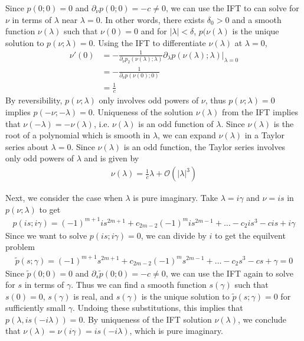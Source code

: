 \documentclass[thesis.tex]{subfiles}
\begin{document}
Since $p(0; 0) = 0$ and $\partial_\nu p(0; 0) = -c \neq 0$, we can use the IFT to can solve for $\nu$ in terms of $\lambda$ near $\lambda = 0$. In other words, there exists $\delta_0 > 0$ and a smooth function $\nu(\lambda)$ such that $\nu(0) = 0$ and for $|\lambda| < \delta$, $p(\nu(\lambda)$ is the unique solution to $p(\nu; \lambda) = 0$. Using the IFT to differentiate $\nu(\lambda)$ at $\lambda = 0$,
\begin{align*}
\nu'(0) &= -\frac{1}{\partial_\nu p_2(\nu(\lambda); \lambda) } \partial_\lambda p ( \nu(\lambda); \lambda ) \Big|_{\lambda = 0}\\
&= -\frac{1}{\partial_\nu p(\nu(0); 0) } \\
&= \frac{1}{c}
\end{align*}
By reversibility, $p(\nu; \lambda)$ only involves odd powers of $\nu$, thus $p(\nu; \lambda) = 0$ implies $p(-\nu; -\lambda) = 0$. Uniqueness of the solution $\nu(\lambda)$ from the IFT implies that $\nu(-\lambda) = -\nu(\lambda)$, i.e. $\nu(\lambda)$ is an odd function of $\lambda$. Since $\nu(\lambda)$ is the root of a polynomial which is smooth in $\lambda$, we can expand $\nu(\lambda)$ in a Taylor series about $\lambda = 0$. Since $\nu(\lambda)$ is an odd function, the Taylor series involves only odd powers of $\lambda$ and is given by
\begin{align*}
\nu(\lambda) = \frac{1}{c} \lambda + \mathcal{O}(|\lambda|^3)
\end{align*}

Next, we consider the case when $\lambda$ is pure imaginary. Take $\lambda = i \gamma$ and $\nu = i s$ in $p(\nu; \lambda)$ to get
\begin{align*}
p(i s; i \gamma) = (-1)^{m+1} i s^{2m+1} + c_{2m-2} (-1)^m i s^{2m-1} + \dots - c_2 i s^3 - c i s + i \gamma
\end{align*}
Since we want to solve $p(i s; i \gamma) = 0$, we can divide by $i$ to get the equilvent problem
\begin{align*}
\tilde{p}(s; \gamma) = (-1)^{m+1} s^{2m+1} + c_{2m-2} (-1)^m s^{2m-1} + \dots - c_2 s^3 - c s + \gamma = 0
\end{align*}
Since $\tilde{p}(0; 0) = 0$ and $\partial_s \tilde{p}(0; 0) = -c \neq 0$, we can use the IFT again to solve for $s$ in terms of $\gamma$. Thus we can find a smooth function $s(\gamma)$ such that $s(0) = 0$, $s(\gamma)$ is real, and $s(\gamma)$ is the unique solution to $\tilde{p}(s; \gamma) = 0$ for sufficiently small $\gamma$. Undoing these substitutions, this implies that $p(\lambda, i s(-i \lambda)) = 0$. By uniqueness of the IFT solution $\nu(\lambda)$, we conclude that $\nu(\lambda) = \nu(i \gamma) = i s(-i \lambda)$, which is pure imaginary.
\end{document}
